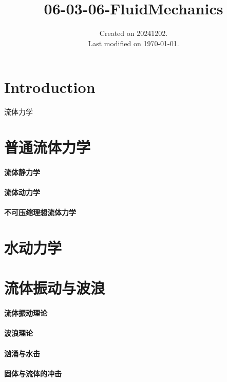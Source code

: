 \documentclass[UTF8]{../../06-Physics}
\begin{document}
\title{06-03-06-FluidMechanics}
\date{Created on 20241202.\\   Last modified on \today.}
\maketitle
\tableofcontents


\chapter{Introduction}

流体力学



\chapter{普通流体力学}
    \subsubsection{流体静力学}
    \subsubsection{流体动力学}
    \subsubsection{不可压缩理想流体力学}


\chapter{水动力学}


\chapter{流体振动与波浪}
    \subsubsection{流体振动理论}
    \subsubsection{波浪理论}
    \subsubsection{汹涌与水击}
    \subsubsection{固体与流体的冲击}
\end{document}
